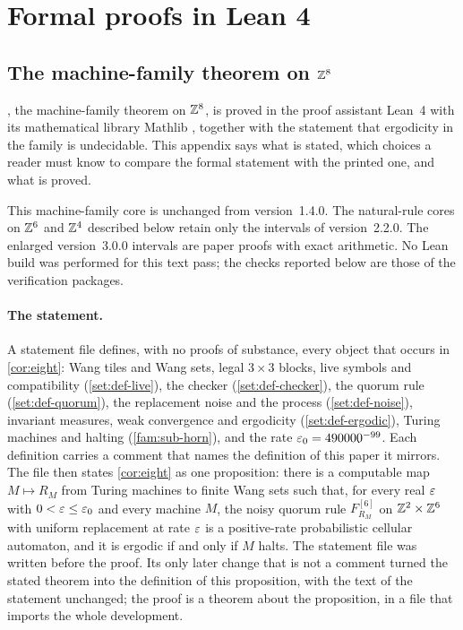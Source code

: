 \section{Formal proofs in Lean 4}\label{app:lean}

\subsection*{The machine-family theorem on $\mathbb{Z}^8$}

, the machine-family theorem on $\mathbb{Z}^8$, is proved in the proof assistant Lean~4 \cite{Lean4} with its mathematical library Mathlib \cite{Mathlib20}, together with the statement that ergodicity in the family is undecidable. This appendix says what is stated, which choices a reader must know to compare the formal statement with the printed one, and what is proved.

\noindent This machine-family core is unchanged from version~1.4.0. The natural-rule cores on $\mathbb{Z}^6$ and $\mathbb{Z}^4$ described below retain only the intervals of version~2.2.0. The enlarged version~3.0.0 intervals are paper proofs with exact arithmetic. No Lean build was performed for this text pass; the checks reported below are those of the verification packages.

\paragraph{The statement.} A statement file defines, with no proofs of substance, every object that occurs in \cref{cor:eight}: Wang tiles and Wang sets, legal $3\times3$ blocks, live symbols and compatibility (\cref{set:def-live}), the checker (\cref{set:def-checker}), the quorum rule (\cref{set:def-quorum}), the replacement noise and the process (\cref{set:def-noise}), invariant measures, weak convergence and ergodicity (\cref{set:def-ergodic}), Turing machines and halting (\cref{fam:sub-horn}), and the rate $\varepsilon_0=490000^{-99}$. Each definition carries a comment that names the definition of this paper it mirrors. The file then states \cref{cor:eight} as one proposition: there is a computable map $M\mapsto R_M$ from Turing machines to finite Wang sets such that, for every real $\varepsilon$ with $0<\varepsilon\le\varepsilon_0$ and every machine $M$, the noisy quorum rule $F^{[6]}_{R_M}$ on $\mathbb{Z}^2\times\mathbb{Z}^6$ with uniform replacement at rate $\varepsilon$ is a positive-rate probabilistic cellular automaton, and it is ergodic if and only if $M$ halts. The statement file was written before the proof. Its only later change that is not a comment turned the stated theorem into the definition of this proposition, with the text of the statement unchanged; the proof is a theorem about the proposition, in a file that imports the whole development.

